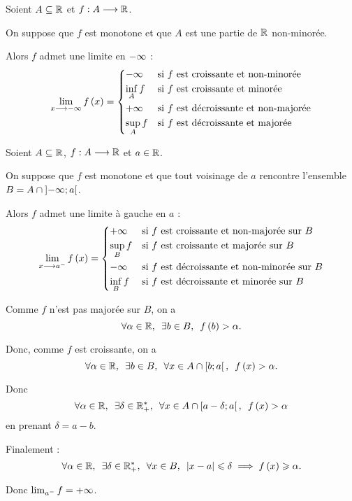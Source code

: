 \begin{theo}
Soient \(A\subseteq\mathbb{R}\) et \(f:A\longrightarrow\mathbb{R}\).

On suppose que \(f\) est monotone et que \(A\) est une partie de \(\mathbb{R}\) non-minorée.

Alors \(f\) admet une limite en \(-\infty\) : \[\lim_{x\longrightarrow-\infty}f\left(x\right)=\begin{dcases}
-\infty &\text{si \(f\) est croissante et non-minorée} \\
\inf_Af &\text{si \(f\) est croissante et minorée} \\
+\infty &\text{si \(f\) est décroissante et non-majorée} \\
\sup_Af &\text{si \(f\) est décroissante et majorée}
\end{dcases}\]
\end{theo}

\begin{theo}
Soient \(A\subseteq\mathbb{R}\), \(f:A\longrightarrow\mathbb{R}\) et \(a\in\mathbb{R}\).

On suppose que \(f\) est monotone et que tout voisinage de \(a\) rencontre l'ensemble \(B=A\cap\left]-\infty;a\right[\).

Alors \(f\) admet une limite à gauche en \(a\) : \[\lim_{x\longrightarrow a^-}f\left(x\right)=\begin{dcases}
+\infty &\text{si \(f\) est croissante et non-majorée sur \(B\)} \\
\sup_Bf &\text{si \(f\) est croissante et majorée sur \(B\)} \\
-\infty &\text{si \(f\) est décroissante et non-minorée sur \(B\)} \\
\inf_Bf &\text{si \(f\) est décroissante et minorée sur \(B\)}
\end{dcases}\]
\end{theo}

\begin{dem}
Comme \(f\) n'est pas majorée sur \(B\), on a \[\quantifs{\forall\alpha\in\R;\exists b\in B}f\paren{b}>\alpha.\]

Donc, comme \(f\) est croissante, on a \[\quantifs{\forall\alpha\in\R;\exists b\in B;\forall x\in A\inter\intervie{b}{a}}f\paren{x}>\alpha.\]

Donc \[\quantifs{\forall\alpha\in\R;\exists\delta\in\Rps;\forall x\in A\inter\intervie{a-\delta}{a}}f\paren{x}>\alpha\] en prenant \(\delta=a-b\).

Finalement : \[\quantifs{\forall\alpha\in\R;\exists\delta\in\Rps;\forall x\in B}\abs{x-a}\leq\delta\imp f\paren{x}\geq\alpha.\]

Donc \(\lim_{a^-}f=+\infty\).
\end{dem}

